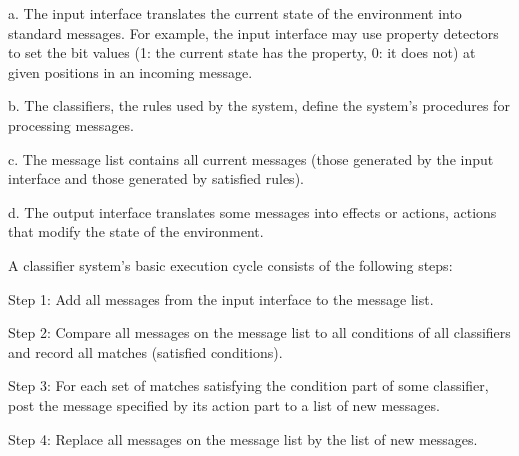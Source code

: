 \documentclass[12pt]{article}
\renewcommand{\_}{\kern-1.5pt\textunderscore\kern-1.5pt}
\begin{document}
\begin{adjustwidth}{1.0in}{0.0in}
a. The input interface translates the current state of the environment into standard messages. For example, the input interface may use property detectors to set the bit values (1: the current state has the property, 0: it does not) at given positions in an incoming message. \par

\end{adjustwidth}

\begin{adjustwidth}{1.0in}{0.0in}
b. The classifiers, the rules used by the system, define the system’s procedures for processing messages. \par

\end{adjustwidth}

\begin{adjustwidth}{1.0in}{0.0in}
c. The message list contains all current messages (those generated by the input interface and those generated by satisfied rules). \par

\end{adjustwidth}

\begin{adjustwidth}{1.0in}{0.0in}
d. The output interface translates some messages into effects or actions, actions that modify the state of the environment.\par

\end{adjustwidth}

A classifier system’s basic execution cycle consists of the following steps:\par

Step 1: Add all messages from the input interface to the message list.\par

Step 2: Compare all messages on the message list to all conditions of all classifiers and record all matches (satisfied conditions). \par

Step 3: For each set of matches satisfying the condition part of some classifier, post the message specified by its action part to a list of new messages.\par

Step 4: Replace all messages on the message list by the list of new messages. \par
\end{document}
